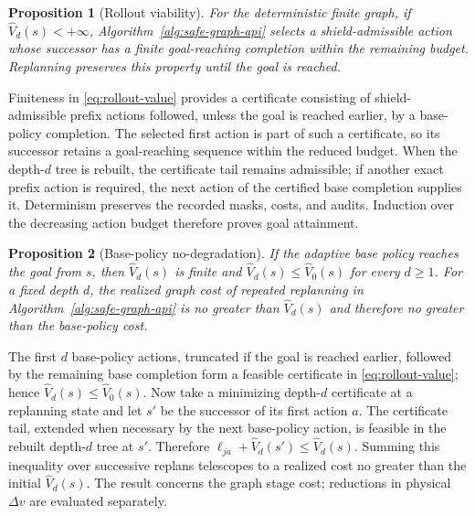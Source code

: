 \documentclass{IEEEtaes}
\newtheorem{proposition}{Proposition}
\theoremstyle{remark}
\theoremstyle{plain}
\begin{document}
\begin{proposition}[Rollout viability]
\label{prop:rollout-viability}
For the deterministic finite graph, if $\widehat V_d(s)<+\infty$, Algorithm~\ref{alg:safe-graph-api} selects a shield-admissible action whose successor has a finite goal-reaching completion within the remaining budget. Replanning preserves this property until the goal is reached.
\end{proposition}

\begin{IEEEproof}
Finiteness in \eqref{eq:rollout-value} provides a certificate consisting of shield-admissible prefix actions followed, unless the goal is reached earlier, by a base-policy completion. The selected first action is part of such a certificate, so its successor retains a goal-reaching sequence within the reduced budget. When the depth-$d$ tree is rebuilt, the certificate tail remains admissible; if another exact prefix action is required, the next action of the certified base completion supplies it. Determinism preserves the recorded masks, costs, and audits. Induction over the decreasing action budget therefore proves goal attainment.
\end{IEEEproof}

\begin{proposition}[Base-policy no-degradation]
\label{prop:base-bound}
If the adaptive base policy reaches the goal from $s$, then $\widehat V_d(s)$ is finite and $\widehat V_d(s)\le\widehat V_0(s)$ for every $d\ge1$. For a fixed depth $d$, the realized graph cost of repeated replanning in Algorithm~\ref{alg:safe-graph-api} is no greater than $\widehat V_d(s)$ and therefore no greater than the base-policy cost.
\end{proposition}

\begin{IEEEproof}
The first $d$ base-policy actions, truncated if the goal is reached earlier, followed by the remaining base completion form a feasible certificate in \eqref{eq:rollout-value}; hence $\widehat V_d(s)\le\widehat V_0(s)$. Now take a minimizing depth-$d$ certificate at a replanning state and let $s'$ be the successor of its first action $a$. The certificate tail, extended when necessary by the next base-policy action, is feasible in the rebuilt depth-$d$ tree at $s'$. Therefore $\ell_{ja}+\widehat V_d(s')\le\widehat V_d(s)$. Summing this inequality over successive replans telescopes to a realized cost no greater than the initial $\widehat V_d(s)$. The result concerns the graph stage cost; reductions in physical $\Delta v$ are evaluated separately.
\end{IEEEproof}
\end{document}
